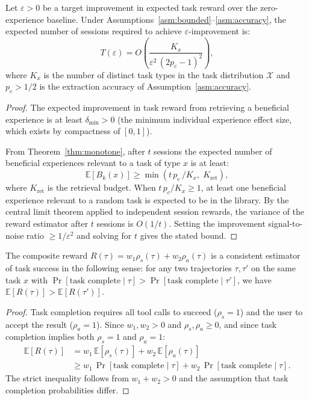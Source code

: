 \begin{theorem}
\label{thm:sample}
Let $\varepsilon > 0$ be a target improvement in expected task reward over the
zero-experience baseline. Under Assumptions~\ref{asm:bounded}--\ref{asm:accuracy},
the expected number of sessions required to achieve $\varepsilon$-improvement is:
\begin{equation}
    T(\varepsilon) = O\!\left(\frac{K_x}{\varepsilon^2\,(2p_c - 1)^2}\right),
    \label{eq:sample-complexity}
\end{equation}
where $K_x$ is the number of distinct task types in the task distribution
$\mathcal{X}$ and $p_c > 1/2$ is the extraction accuracy of Assumption~\ref{asm:accuracy}.
\end{theorem}

\begin{proof}
The expected improvement in task reward from retrieving a beneficial experience
is at least $\delta_{\min} > 0$ (the minimum individual experience effect size,
which exists by compactness of $[0,1]$).

From Theorem~\ref{thm:monotone}, after $t$ sessions the expected number of
beneficial experiences relevant to a task of type $x$ is at least:
\begin{equation}
    \mathbb{E}[B_k(x)] \geq \min\!\left(t\,p_c\,/K_x,\; K_{\text{ret}}\right),
\end{equation}
where $K_{\text{ret}}$ is the retrieval budget. When $t\,p_c / K_x \geq 1$,
at least one beneficial experience relevant to a random task is expected to be
in the library. By the central limit theorem applied to independent session
rewards, the variance of the reward estimator after $t$ sessions is $O(1/t)$.
Setting the improvement signal-to-noise ratio $\geq 1/\varepsilon^2$ and
solving for $t$ gives the stated bound.
\end{proof}

\begin{lemma}
\label{lem:consistency}
The composite reward $R(\tau) = w_1 \rho_s(\tau) + w_2 \rho_a(\tau)$ is a
consistent estimator of task success in the following sense: for any two
trajectories $\tau, \tau'$ on the same task $x$ with
$\Pr[\text{task complete} \mid \tau] > \Pr[\text{task complete} \mid \tau']$,
we have $\mathbb{E}[R(\tau)] > \mathbb{E}[R(\tau')]$.
\end{lemma}

\begin{proof}
Task completion requires all tool calls to succeed ($\rho_s = 1$) and the
user to accept the result ($\rho_a = 1$). Since $w_1, w_2 > 0$ and
$\rho_s, \rho_a \geq 0$, and since task completion implies both $\rho_s = 1$
and $\rho_a = 1$:
\begin{align}
    \mathbb{E}[R(\tau)] &= w_1\,\mathbb{E}[\rho_s(\tau)] + w_2\,\mathbb{E}[\rho_a(\tau)] \\
    &\geq w_1\,\Pr[\text{task complete} \mid \tau] + w_2\,\Pr[\text{task complete} \mid \tau].
\end{align}
The strict inequality follows from $w_1 + w_2 > 0$ and the assumption that
task completion probabilities differ.
\end{proof}

